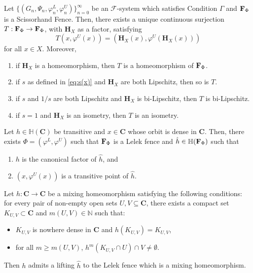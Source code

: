 \documentclass[10pt,a4paper]{amsart}
\newcommand{\N}{\mathbb{N}}  %
\newcommand{\cF}{\mathcal{F}}
\newcommand{\cantor}{\mathbf C}
\newcommand{\fence}{{\bf F}_{\Phi}{}}
\newcommand{\fsystem}{\{(G_n, \Psi_n,\varphi^L_n,\varphi^U_n)\}_{n=0}^{\infty}}
\newcommand{\groupcantor}{{\mathbb H}(\cantor)}
\newcommand{\groupfence}{{\mathbb{H}(\fence)}}
\newcommand{\homeocantor}{{\mathbf H}_{X}}
\begin{document}
\begin{theorem}\label{thm:mainF}
Let $\fsystem$ be an $\cF$-system which satisfies Condition $\Gamma$ and  ${\bf F}_{\Phi}$ is a Scissorhand Fence. 
Then, there exists a unique continuous surjection $T: {\bf F}_{\Phi}\rightarrow {\bf F}_{\Phi}$, with $\homeocantor$ as a factor, satisfying \[T\left(x, \varphi^U(x)\right)=\left(\homeocantor(x), \varphi^U(\homeocantor(x))\right)\] for all $x \in X$.
 Moreover, 
 \begin{enumerate}
         \item if $\homeocantor$ is a homeomorphism, then $T$ is a homeomorphism of ${\bf F}_{\Phi}$.
     \item if $s$ as defined in \eqref{eq:s(x)} and $\homeocantor$ are both Lipschitz, then so is $T$.
     \item if $s$ and $1/s$ are both Lipschitz and $\homeocantor$ is bi-Lipschitz, then $T$ is bi-Lipschitz.
     \item if $s=1$ and $\homeocantor$ is an isometry, then $T$ is an isometry.
 \end{enumerate}
\end{theorem}

\begin{theorem}\label{thm:transitive}
    Let $h \in \groupcantor$ be transitive and  $x \in \cantor$ whose orbit is dense in $\cantor$. Then, there exists $\Phi = (\varphi^L, \varphi^U)$ such that $\fence$ is a Lelek fence and $\hat{h} \in \groupfence$ such that 
    \begin{enumerate}
        \item[a)] $h$ is the canonical factor of $\hat{h}$, and
        \item [b)] $(x, \varphi^U(x))$ is a transitive point of $\hat{h}$.
    \end{enumerate}
\end{theorem}

\begin{theorem}\label{thm:mixing}
Let $h:\cantor \rightarrow \cantor$ be a mixing homeomorphism satisfying the following conditions:
for every pair of non-empty open sets \( U, V \subseteq \cantor \), there exists a  compact set \( K_{U,V}\subset \cantor  \) and $m(U,V) \in \N$ such that:
\begin{itemize}
\item $K_{U,V}$ is nowhere dense in $\cantor$ and $h(K_{U,V} )=K_{U,V}$,
    \item for all \( m \geq m(U,V) \), \( h^m(K_{U,V} \cap U) \cap V \neq \emptyset \).
\end{itemize}

Then $h$ admits a lifting $\hat{h}$ to the Lelek fence which is a mixing homeomorphism.
\end{theorem}
\end{document}
